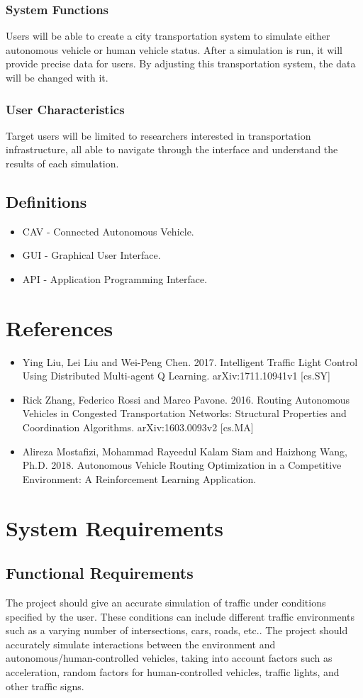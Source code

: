 \documentclass[10pt,letterpaper,draftclsnofoot,onecolumn]{IEEEtran}
\begin{document}
		\subsubsection{System Functions}
		Users will be able to create a city transportation system to simulate either autonomous vehicle or human vehicle status. After a simulation is run, it will provide precise data for users. By adjusting this transportation system, the data will be changed with it.
		\subsubsection{User Characteristics}
		Target users will be limited to researchers interested in transportation infrastructure, all able to navigate through the interface and understand the results of each simulation.
	\subsection{Definitions}
		\begin{itemize}
			\item CAV - Connected Autonomous Vehicle.
			\item GUI - Graphical User Interface.
			\item API - Application Programming Interface.
		\end{itemize}
\section{References}
\begin{itemize}
\item Ying Liu, Lei Liu and Wei-Peng Chen. 2017. Intelligent Traffic Light Control Using Distributed Multi-agent Q Learning. arXiv:1711.10941v1 [cs.SY]
\item Rick Zhang, Federico Rossi and Marco Pavone. 2016. Routing Autonomous Vehicles in Congested Transportation Networks: Structural Properties and Coordination Algorithms. arXiv:1603.0093v2 [cs.MA]
\item Alireza Mostafizi, Mohammad Rayeedul Kalam Siam and Haizhong Wang, Ph.D. 2018.  Autonomous Vehicle Routing Optimization in a Competitive Environment: A Reinforcement Learning Application.
\end{itemize}
\section{System Requirements}
	\subsection{Functional Requirements}
	The project should give an accurate simulation of traffic under conditions specified by the user. These conditions can include different traffic environments such as a varying number of intersections, cars, roads, etc.. The project should accurately simulate interactions between the environment and autonomous/human-controlled vehicles, taking into account factors such as acceleration, random factors for human-controlled vehicles, traffic lights, and other traffic signs.
\end{document}
